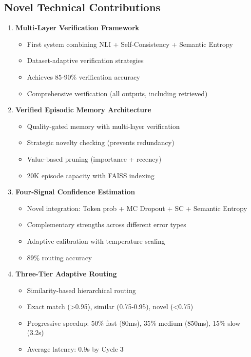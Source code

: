 \documentclass[12pt,a4paper]{article}
\theoremstyle{definition}
\begin{document}
\subsection{Novel Technical Contributions}

\begin{enumerate}
    \item \textbf{Multi-Layer Verification Framework}
    \begin{itemize}
        \item First system combining NLI + Self-Consistency + Semantic Entropy
        \item Dataset-adaptive verification strategies
        \item Achieves 85-90\% verification accuracy
        \item Comprehensive verification (all outputs, including retrieved)
    \end{itemize}
    
    \item \textbf{Verified Episodic Memory Architecture}
    \begin{itemize}
        \item Quality-gated memory with multi-layer verification
        \item Strategic novelty checking (prevents redundancy)
        \item Value-based pruning (importance + recency)
        \item 20K episode capacity with FAISS indexing
    \end{itemize}
    
    \item \textbf{Four-Signal Confidence Estimation}
    \begin{itemize}
        \item Novel integration: Token prob + MC Dropout + SC + Semantic Entropy
        \item Complementary strengths across different error types
        \item Adaptive calibration with temperature scaling
        \item 89\% routing accuracy
    \end{itemize}
    
    \item \textbf{Three-Tier Adaptive Routing}
    \begin{itemize}
        \item Similarity-based hierarchical routing
        \item Exact match (>0.95), similar (0.75-0.95), novel (<0.75)
        \item Progressive speedup: 50\% fast (80ms), 35\% medium (850ms), 15\% slow (3.2s)
        \item Average latency: 0.9s by Cycle 3
    \end{itemize}
    

\end{enumerate}
\end{document}

